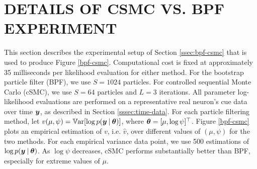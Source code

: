 \documentclass[twoside]{article}
\begin{document}
\section{DETAILS OF CSMC VS. BPF EXPERIMENT} \label{csmc-bpf-app}
This section describes the experimental setup of Section \ref{ssec:bpf-csmc} that is used to produce Figure \ref{bpf-csmc}.  Computational cost is fixed at approximately 35 milliseconds per likelihood evaluation for either method.  For the bootstrap particle filter (BPF), we use $S = 1024$ particles.  For controlled sequential Monte Carlo (cSMC), we use $S = 64$ particles and $L = 3$ iterations.  All parameter log-likelihood evaluations are performed on a representative real neuron's cue data over time $\boldsymbol{y}$, as described in Section \ref{sssec:time-data}.  For each particle filtering method, let $v(\mu, \psi) = \mathbb{V}\text{ar}[\log p(\boldsymbol{y} \:\vert\: \boldsymbol{\theta})]$, where $\boldsymbol{\theta} = [\mu, \log \psi]^\top$.  Figure \ref{bpf-csmc} plots an empirical estimation of $v$, i.e. $\hat{v}$, over different values of $(\mu, \psi)$ for the two methods.  For each empirical variance data point, we use 500 estimations of $\log p(\boldsymbol{y} \:\vert\: \boldsymbol{\theta})$.  As $\log \psi$ decreases, cSMC performs substantially better than BPF, especially for extreme values of $\mu$.  
\end{document}
